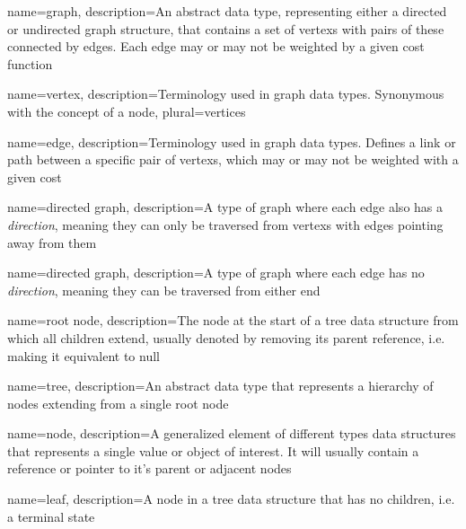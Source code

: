 
{
	name=graph,
	description={An abstract data type, representing either a \gls{directed} or \gls{undirected} graph structure, that contains a set of \glspl{vertex} with pairs of these connected by \glspl{edge}. Each edge may or may not be weighted by a given cost function}
}

{
	name=vertex,
	description={Terminology used in \gls{graph} data types. Synonymous with the concept of a \gls{node}},
	plural=vertices
}

{
	name=edge,
	description={Terminology used in \gls{graph} data types. Defines a link or path between a specific pair of \glspl{vertex}, which may or may not be weighted with a given cost}
}

{
	name={directed graph},
	description={A type of \gls{graph} where each \gls{edge} also has a \textit{direction}, meaning they can only be traversed from \glspl{vertex} with edges pointing away from them}
}

{
	name={directed graph},
	description={A type of \gls{graph} where each \gls{edge} has no \textit{direction}, meaning they can be traversed from either end}
}

{
	name={root node},
	description={The node at the start of a tree data structure from which all children extend, usually denoted by removing its parent reference, i.e. making it equivalent to null}
}

{
	name=tree,
	description={An abstract data type that represents a hierarchy of \glspl{node} extending from a single \gls{root} node}
}

{
	name=node,
	description={A generalized element of different types data structures that represents a single value or object of interest. It will usually contain a reference or pointer to it's parent or adjacent nodes}
}

{
	name=leaf,
	description={A \gls{node} in a \gls{tree} data structure that has no children, i.e. a terminal state}
}

